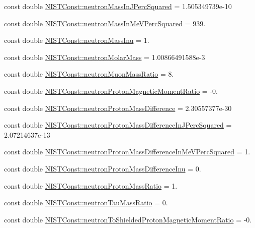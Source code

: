 \begin{DoxyCompactItemize}
\item 
const double \hyperlink{group___neutron_ga28892913d6ed40673a170941f79bb86e}{N\+I\+S\+T\+Const\+::neutron\+Mass\+In\+J\+Perc\+Squared} = 1.\+505349739e-\/10
\item 
const double \hyperlink{group___neutron_ga53f986a22e4dcb31cc8ed8151fd18a8e}{N\+I\+S\+T\+Const\+::neutron\+Mass\+In\+Me\+V\+Perc\+Squared} = 939.
\item 
const double \hyperlink{group___neutron_ga7931fb41eb5f1acf4b94d9d6b92ca4c3}{N\+I\+S\+T\+Const\+::neutron\+Mass\+Inu} = 1.
\item 
const double \hyperlink{group___neutron_ga0f7ab7fc272f54c17ecf777efff7003b}{N\+I\+S\+T\+Const\+::neutron\+Molar\+Mass} = 1.\+00866491588e-\/3
\item 
const double \hyperlink{group___neutron_ga91ae8b70076ca6001d2141d1df72a39c}{N\+I\+S\+T\+Const\+::neutron\+Muon\+Mass\+Ratio} = 8.
\item 
const double \hyperlink{group___neutron_ga98c2f64e48dbd352a997b82d8815daba}{N\+I\+S\+T\+Const\+::neutron\+Proton\+Magnetic\+Moment\+Ratio} = -\/0.
\item 
const double \hyperlink{group___neutron_ga95ef0427b50433511707f0949fc503b9}{N\+I\+S\+T\+Const\+::neutron\+Proton\+Mass\+Difference} = 2.\+30557377e-\/30
\item 
const double \hyperlink{group___neutron_gaa89b2b23475d809d4d3a4c46e7556b71}{N\+I\+S\+T\+Const\+::neutron\+Proton\+Mass\+Difference\+In\+J\+Perc\+Squared} = 2.\+07214637e-\/13
\item 
const double \hyperlink{group___neutron_gae96854e1fcd14f08cc92a060c6690730}{N\+I\+S\+T\+Const\+::neutron\+Proton\+Mass\+Difference\+In\+Me\+V\+Perc\+Squared} = 1.
\item 
const double \hyperlink{group___neutron_ga570caff89957976a8486d25e5288df51}{N\+I\+S\+T\+Const\+::neutron\+Proton\+Mass\+Difference\+Inu} = 0.
\item 
const double \hyperlink{group___neutron_gad8a08222b3de2105b5b399faa5a59fbd}{N\+I\+S\+T\+Const\+::neutron\+Proton\+Mass\+Ratio} = 1.
\item 
const double \hyperlink{group___neutron_ga9c3ba7b26cbcc0b2f7f7fa551812683a}{N\+I\+S\+T\+Const\+::neutron\+Tau\+Mass\+Ratio} = 0.
\item 
const double \hyperlink{group___neutron_ga7446ad6eb4c1e0b8167d1a1ff5c4cd89}{N\+I\+S\+T\+Const\+::neutron\+To\+Shielded\+Proton\+Magnetic\+Moment\+Ratio} = -\/0.

\end{DoxyCompactItemize}
